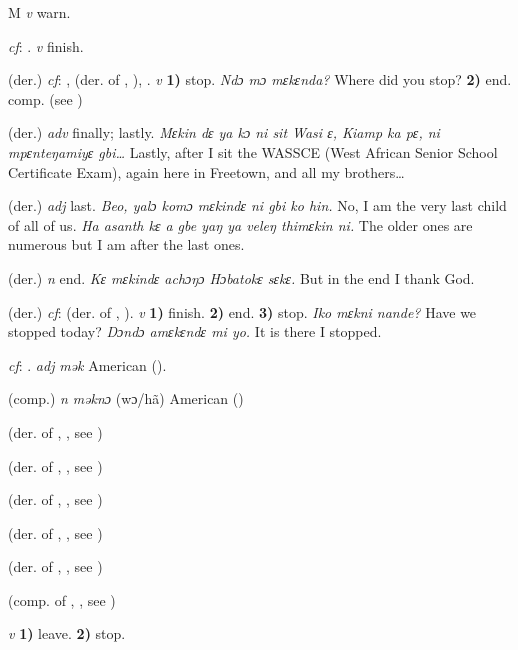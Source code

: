 \begin{letter}{M}
 \textit{v} warn.

 \textit{cf}: . \textit{v} finish.

 (der.) \textit{cf}: ,  (der. of , ), . \textit{v} \textbf{1)} stop. \textit{Ndɔ mɔ mɛkɛnda?} Where did you stop? \textbf{2)} end. comp.  (see ) 

 (der.) \textit{adv} finally; lastly. \textit{Mɛkin dɛ ya kɔ ni sit Wasi ɛ, Kiamp ka pɛ, ni mpɛnteŋamiyɛ gbi…} Lastly, after I sit the WASSCE (West African Senior School Certificate Exam), again here in Freetown, and all my brothers…

 (der.) \textit{adj} last. \textit{Beo, yalɔ komɔ mɛkindɛ ni gbi ko hin.} No, I am the very last child of all of us. \textit{Ha asanth kɛ a gbe yaŋ ya veleŋ thimɛkin ni.} The older ones are numerous but I am after the last ones.

 (der.) \textit{n} end. \textit{Kɛ mɛkindɛ achɔŋɔ Hɔbatokɛ sɛkɛ.} But in the end I thank God.

 (der.) \textit{cf}:  (der. of , ). \textit{v} \textbf{1)} finish. \textbf{2)} end. \textbf{3)} stop. \textit{Iko mɛkni nande?} Have we stopped today? \textit{Dɔndɔ amɛkɛndɛ mi yo.} It is there I stopped.

 \textit{cf}: . \textit{adj} \textit{mək} American (\citealt{Pichl1967}).

 (comp.) \textit{n} \textit{məknɔ} (wɔ/hã) American (\citealt{Pichl1967})

 (der. of , , see )

 (der. of , , see ) 

 (der. of , , see ) 

 (der. of , , see ) 

 (der. of , , see ) 

 (comp. of , , see ) 

 \textit{v} \textbf{1)} leave. \textbf{2)} stop.


\end{letter}
